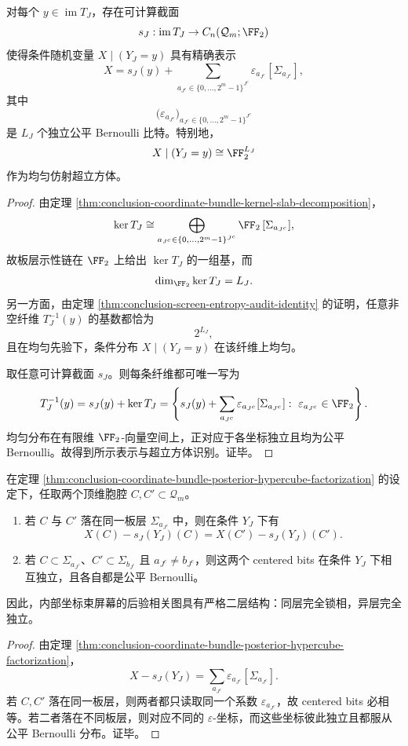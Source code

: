 \begin{theorem}[内部坐标束屏幕后验的超立方体因子化]\label{thm:conclusion-coordinate-bundle-posterior-hypercube-factorization}
对每个 \(y\in \operatorname{im}T_J\)，存在可计算截面
\[
s_J:\operatorname{im}T_J\to C_n(\mathcal Q_m;\FF_2)
\]
使得条件随机变量 \(X\mid (Y_J=y)\) 具有精确表示
\[
X
=
s_J(y)+
\sum_{a_{J^c}\in\{0,\dots,2^m-1\}^{J^c}}
\varepsilon_{a_{J^c}}[\Sigma_{a_{J^c}}],
\]
其中
\[
\bigl(\varepsilon_{a_{J^c}}\bigr)_{a_{J^c}\in\{0,\dots,2^m-1\}^{J^c}}
\]
是 \(L_J\) 个独立公平 Bernoulli 比特。特别地，
\[
X\mid (Y_J=y)\cong \FF_2^{L_J}
\]
作为均匀仿射超立方体。
\end{theorem}
\begin{proof}
由定理 \ref{thm:conclusion-coordinate-bundle-kernel-slab-decomposition}，
\[
\ker T_J
\cong
\bigoplus_{a_{J^c}\in\{0,\dots,2^m-1\}^{J^c}}\FF_2\,[\Sigma_{a_{J^c}}],
\]
故板层示性链在 \(\FF_2\) 上给出 \(\ker T_J\) 的一组基，而
\[
\dim_{\FF_2}\ker T_J=L_J.
\]
另一方面，由定理 \ref{thm:conclusion-screen-entropy-audit-identity} 的证明，任意非空纤维 \(T_J^{-1}(y)\) 的基数都恰为
\[
2^{L_J},
\]
且在均匀先验下，条件分布 \(X\mid(Y_J=y)\) 在该纤维上均匀。

取任意可计算截面 \(s_J\)。则每条纤维都可唯一写为
\[
T_J^{-1}(y)=s_J(y)+\ker T_J
=
\left\{
s_J(y)+
\sum_{a_{J^c}}\varepsilon_{a_{J^c}}[\Sigma_{a_{J^c}}]:
\ \varepsilon_{a_{J^c}}\in\FF_2
\right\}.
\]
均匀分布在有限维 \(\FF_2\)-向量空间上，正对应于各坐标独立且均为公平 Bernoulli。故得到所示表示与超立方体识别。证毕。
\end{proof}

\begin{corollary}[后验相关结构的板层刚性]\label{cor:conclusion-coordinate-bundle-posterior-slab-rigidity}
在定理 \ref{thm:conclusion-coordinate-bundle-posterior-hypercube-factorization} 的设定下，任取两个顶维胞腔 \(C,C'\subset \mathcal Q_m\)。
\begin{enumerate}
  \item 若 \(C\) 与 \(C'\) 落在同一板层 \(\Sigma_{a_{J^c}}\) 中，则在条件 \(Y_J\) 下有
  \[
  X(C)-s_J(Y_J)(C)=X(C')-s_J(Y_J)(C').
  \]
  \item 若 \(C\subset \Sigma_{a_{J^c}}\)、\(C'\subset \Sigma_{b_{J^c}}\) 且 \(a_{J^c}\neq b_{J^c}\)，则这两个 centered bits 在条件 \(Y_J\) 下相互独立，且各自都是公平 Bernoulli。
\end{enumerate}
因此，内部坐标束屏幕的后验相关图具有严格二层结构：同层完全锁相，异层完全独立。
\end{corollary}
\begin{proof}
由定理 \ref{thm:conclusion-coordinate-bundle-posterior-hypercube-factorization}，
\[
X-s_J(Y_J)
=
\sum_{a_{J^c}}\varepsilon_{a_{J^c}}[\Sigma_{a_{J^c}}].
\]
若 \(C,C'\) 落在同一板层，则两者都只读取同一个系数 \(\varepsilon_{a_{J^c}}\)，故 centered bits 必相等。若二者落在不同板层，则对应不同的 \(\varepsilon\)-坐标，而这些坐标彼此独立且都服从公平 Bernoulli 分布。证毕。
\end{proof}

